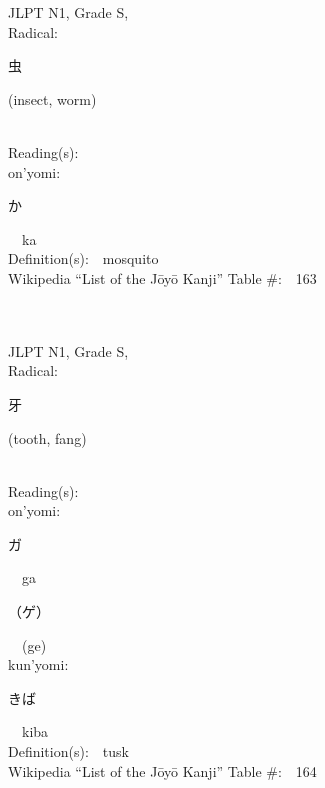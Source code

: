 \begin{multicols}{2}
{JLPT N1, Grade S, \\Radical:\ \ {\begin{CJK}{UTF8}{min} 虫 \end{CJK}} (insect, worm) } \\
Reading(s):\ \ \\
{\hspace*{1em}}on'yomi:\ \ \\
{\hspace*{2em}}{\begin{CJK}{UTF8}{min} か \end{CJK}}\ \ ka\ \ \\
Definition(s):\ \ mosquito \\
Wikipedia ``List of the J\=oy\=o Kanji'' Table \#:\ \ 163 \\
\ \ \\
{\fontsize{34pt}{40pt}  }\ \ \\
{JLPT N1, Grade S, \\Radical:\ \ {\begin{CJK}{UTF8}{min} 牙 \end{CJK}} (tooth, fang) } \\
Reading(s):\ \ \\
{\hspace*{1em}}on'yomi:\ \ \\
{\hspace*{2em}}{\begin{CJK}{UTF8}{min} ガ \end{CJK}}\ \ ga\ \ \\
{\hspace*{2em}}{\begin{CJK}{UTF8}{min} （ゲ） \end{CJK}}\ \ (ge)\ \ \\
{\hspace*{1em}}kun'yomi:\ \ \\
{\hspace*{2em}}{\begin{CJK}{UTF8}{min} きば \end{CJK}}\ \ kiba\ \ \\
Definition(s):\ \ tusk \\
Wikipedia ``List of the J\=oy\=o Kanji'' Table \#:\ \ 164 \\
\ \ \\
{\fontsize{34pt}{40pt}  }\ \ \\

\end{multicols}
